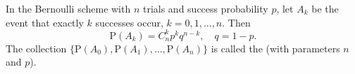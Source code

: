 In the Bernoulli scheme with $n$ trials and success probability $p$, let $A_k$ be the event that exactly $k$ successes occur, $k = 0, 1, \ldots, n$. Then
$$\text{P}(A_k) = C_n^k p^k q^{n-k}, \quad q = 1-p.$$
The collection $\{\text{P}(A_0), \text{P}(A_1), \ldots, \text{P}(A_n)\}$ is called the  (with parameters $n$ and $p$).
